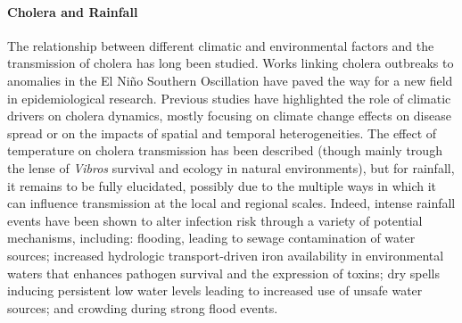 \paragraph{Cholera and Rainfall} The relationship between different climatic and environmental factors and the transmission of cholera has long been studied. Works linking cholera outbreaks to anomalies in the El Niño Southern Oscillation  have paved the way for a new field in epidemiological research. Previous studies have highlighted the role of climatic drivers on cholera dynamics, mostly focusing on climate change effects on disease spread or on the impacts of spatial and temporal heterogeneities. The effect of temperature on cholera transmission has been described (though mainly trough the lense of \textit{Vibros} survival and ecology in natural environments), but for rainfall, it remains to be fully elucidated, possibly due to the multiple ways in which it can influence transmission at the local and regional scales. Indeed, intense rainfall events have been shown to alter infection risk through a variety of potential mechanisms, including: flooding, leading to sewage contamination of water sources; increased hydrologic transport-driven iron availability in environmental waters that enhances pathogen survival and the expression of toxins; dry spells inducing persistent low water levels leading to increased use of unsafe water sources; and crowding during strong flood events.

